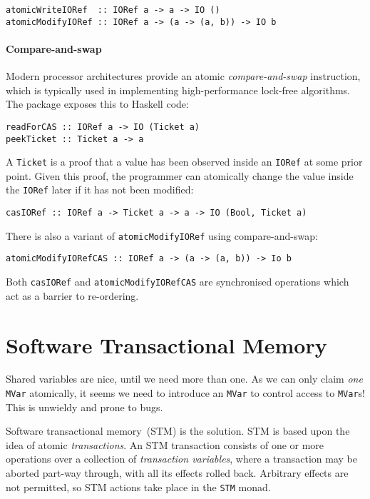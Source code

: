 \begin{verbatim}
atomicWriteIORef  :: IORef a -> a -> IO ()
atomicModifyIORef :: IORef a -> (a -> (a, b)) -> IO b
\end{verbatim}

\paragraph{Compare-and-swap}
Modern processor architectures provide an atomic \emph{compare-and-swap}
instruction, which is typically used in implementing high-performance lock-free
algorithms.  The  package exposes this to Haskell code:

\begin{verbatim}
readForCAS :: IORef a -> IO (Ticket a)
peekTicket :: Ticket a -> a
\end{verbatim}

A \verb|Ticket| is a proof that a value has been observed inside an \verb|IORef|
at some prior point.  Given this proof, the programmer can atomically change the
value inside the \verb|IORef| later if it has not been modified:

\begin{verbatim}
casIORef :: IORef a -> Ticket a -> a -> IO (Bool, Ticket a)
\end{verbatim}

There is also a variant of \verb|atomicModifyIORef| using compare-and-swap:

\begin{verbatim}
atomicModifyIORefCAS :: IORef a -> (a -> (a, b)) -> Io b
\end{verbatim}

Both \verb|casIORef| and \verb|atomicModifyIORefCAS| are synchronised operations
which act as a barrier to re-ordering.

\section{Software Transactional Memory}
\label{sec:concurrent_haskell-stm}

Shared variables are nice, until we need more than one.  As we can only claim
\emph{one} \verb|MVar| atomically, it seems we need to introduce an \verb|MVar|
to control access to \verb|MVar|s!  This is unwieldy and prone to bugs.

Software transactional memory~(STM) is the solution.  STM is based upon the idea
of atomic \emph{transactions}.  An STM transaction consists of one or more
operations over a collection of \emph{transaction variables}, where a
transaction may be aborted part-way through, with all its effects rolled back.
Arbitrary effects are not permitted, so STM actions take place in the \verb|STM|
monad.

